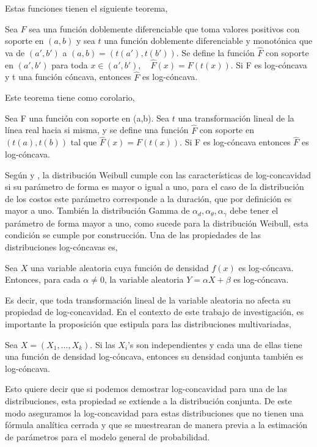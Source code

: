Estas funciones tienen el siguiente teorema,
\begin{teo}
Sea $F$ sea una funci\'on doblemente diferenciable que toma valores positivos con soporte en $(a,b)$ y sea $t$ una funci\'on doblemente diferenciable y monot\'onica que va de $(a',b')$ a $(a,b)=(t(a'),t(b'))$. Se define la funci\'on $\hat{F}$ con soporte en $(a',b')$ para toda $x \in (a',b'), \quad \hat{F}(x)=F(t(x))$. Si F es log-c\'oncava y t una funci\'on c\'oncava, entonces $\hat{F}$ es log-c\'oncava.
\end{teo}
Este teorema tiene como corolario,
\begin{cor}
Sea F una funci\'on con soporte en (a,b). Sea $t$ una transformaci\'on lineal de la l\'inea real hacia si misma, y se define una funci\'on $\hat{F}$ con soporte en $(t(a),t(b))$ tal que $\hat{F}(x)=F(t(x))$. Si F es log-c\'oncava entonces $\hat{F}$ es log-c\'oncava. 
\end{cor}
Seg\'un \cite{bagnoli2005log} y \cite{an1996log}, la distribuci\'on Weibull cumple con las caracter\'isticas de log-concavidad si su par\'ametro de forma es mayor o igual a uno, para el caso de la distribuci\'on de los costos este par\'ametro corresponde a la duraci\'on, que por definici\'on es mayor a uno. Tambi\'en la distribuci\'on Gamma de $\alpha_d,\alpha_\theta, \alpha_\gamma$ debe tener el par\'ametro de forma mayor a uno, como sucede para la distribuci\'on Weibull, esta condici\'on se cumple por construcci\'on. Una de las propiedades de las distribuciones log-c\'oncavas es,
\begin{prop}
Sea $X$ una variable aleatoria cuya funci\'on de densidad $f(x)$ es log-c\'oncava. Entonces, para cada $\alpha \neq 0$, la variable aleatoria $Y=\alpha X+\beta$ es log-c\'oncava.
\end{prop}
Es decir, que toda transformaci\'on lineal de la variable aleatoria no afecta su propiedad de log-concavidad. En el contexto de este trabajo de investigaci\'on, es importante la proposici\'on que estipula \cite{an1996log} para las distribuciones multivariadas,
\begin{prop}
Sea $X = (X_1,...,X_k)$. Si las $X_i$'s son independientes y cada una de ellas tiene una funci\'on de densidad log-c\'oncava, entonces su densidad conjunta tambi\'en es log-c\'oncava.
\end{prop}
Esto quiere decir que si podemos demostrar log-concavidad para una de las distribuciones, esta propiedad se extiende a la distribuci\'on conjunta. De este modo aseguramos la log-concavidad para estas distribuciones que no tienen una f\'ormula anal\'itica cerrada y que se muestrearan de manera previa a la estimaci\'on de par\'ametros para el modelo general de probabilidad.\\
